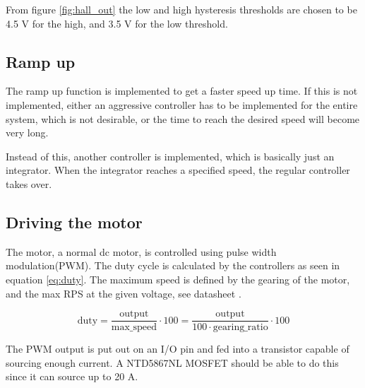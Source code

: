 From figure \ref{fig:hall_out} the low and high hysteresis thresholds are chosen to be 4.5 V for the high, and 3.5 V for the low threshold.

\subsection{Ramp up}

The ramp up function is implemented to get a faster speed up time.
If this is not implemented, either an aggressive controller has to be implemented for the entire system, which is not desirable, or the time to reach the desired speed will become very long.

Instead of this, another controller is implemented, which is basically just an integrator.
When the integrator reaches a specified speed, the regular controller takes over. 


\subsection{Driving the motor}

The motor, a normal dc motor, is controlled using pulse width modulation(PWM). The duty cycle is calculated by the controllers as seen in equation \ref{eq:duty}. The maximum speed is defined by the gearing of the motor, and the max RPS at the given voltage, see datasheet \cite{datasheet:motor}. 

\begin{equation}\label{eq:duty}
 \text{duty} = \frac{\text{output}}{\text{max\_speed}}\cdot 100 = \frac{\text{output}}{100\cdot \text{gearing\_ratio}}\cdot 100
\end{equation}

The PWM output is put out on an I/O pin and fed into a transistor capable of sourcing enough current.
A NTD5867NL MOSFET should be able to do this since it can source up to 20 A\cite{datasheet:mosfet}.
